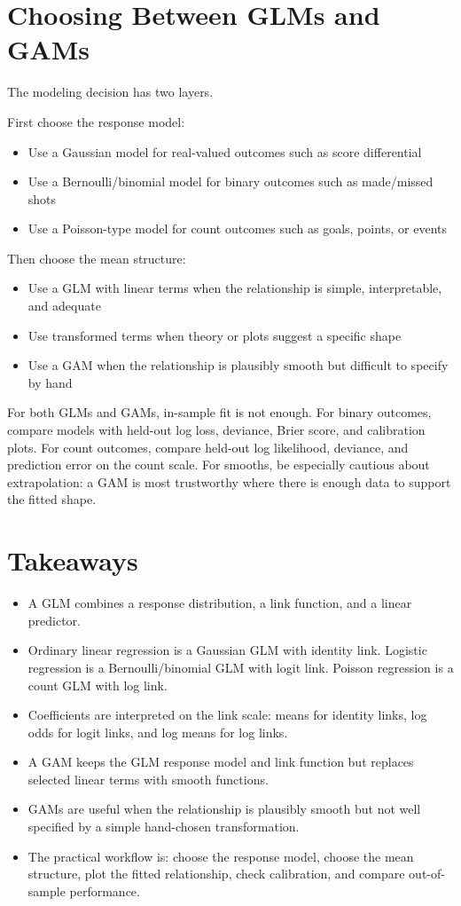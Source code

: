 \documentclass[twoside]{article}
\theoremstyle{definition}
\begin{document}
\section{Choosing Between GLMs and GAMs}

The modeling decision has two layers.

First choose the response model:
\begin{itemize}
    \item[-] Use a Gaussian model for real-valued outcomes such as score differential
    \item[-] Use a Bernoulli/binomial model for binary outcomes such as made/missed shots
    \item[-] Use a Poisson-type model for count outcomes such as goals, points, or events
\end{itemize}

Then choose the mean structure:
\begin{itemize}
    \item[-] Use a GLM with linear terms when the relationship is simple, interpretable, and adequate
    \item[-] Use transformed terms when theory or plots suggest a specific shape
    \item[-] Use a GAM when the relationship is plausibly smooth but difficult to specify by hand
\end{itemize}

For both GLMs and GAMs, in-sample fit is not enough. For binary outcomes, compare models with held-out log loss, deviance, Brier score, and calibration plots. For count outcomes, compare held-out log likelihood, deviance, and prediction error on the count scale. For smooths, be especially cautious about extrapolation: a GAM is most trustworthy where there is enough data to support the fitted shape.

\section*{Takeaways}

\begin{itemize}
    \item A GLM combines a response distribution, a link function, and a linear predictor.
    \item Ordinary linear regression is a Gaussian GLM with identity link. Logistic regression is a Bernoulli/binomial GLM with logit link. Poisson regression is a count GLM with log link.
    \item Coefficients are interpreted on the link scale: means for identity links, log odds for logit links, and log means for log links.
    \item A GAM keeps the GLM response model and link function but replaces selected linear terms with smooth functions.
    \item GAMs are useful when the relationship is plausibly smooth but not well specified by a simple hand-chosen transformation.
    \item The practical workflow is: choose the response model, choose the mean structure, plot the fitted relationship, check calibration, and compare out-of-sample performance.
\end{itemize}
\end{document}
